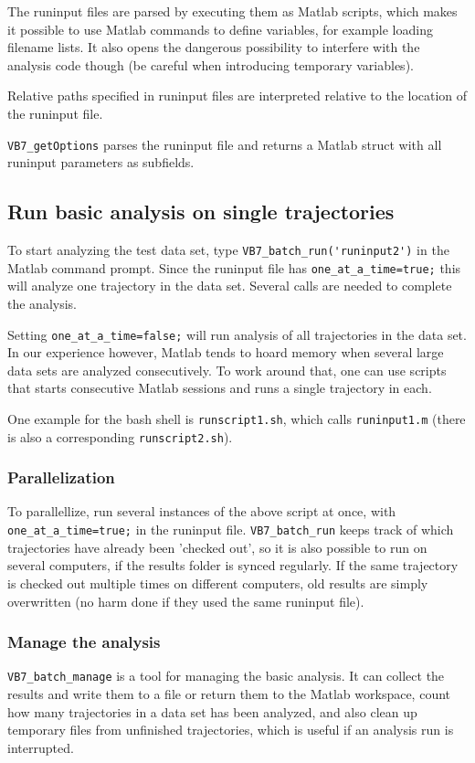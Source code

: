 The runinput files are parsed by executing them as Matlab scripts,
which makes it possible to use Matlab commands to define variables,
for example loading filename lists. It also opens the dangerous
possibility to interfere with the analysis code though (be careful when
introducing temporary variables).

Relative paths specified in runinput files are interpreted relative to
the location of the runinput file.

\texttt{VB7\_getOptions} parses the runinput file and returns a Matlab
struct with all runinput parameters as subfields.

\subsection{Run basic analysis on single trajectories}
To start analyzing the test data set, type
\verb+VB7_batch_run('runinput2')+ in the Matlab command prompt. Since
the runinput file has \verb+one_at_a_time=true;+ this will analyze one
trajectory in the data set. Several calls are needed to complete the
analysis. 

Setting \verb+one_at_a_time=false;+ will run analysis of all
trajectories in the data set. In our experience however, Matlab tends
to hoard memory when several large data sets are analyzed
consecutively.  To work around that, one can use scripts that starts
consecutive Matlab sessions and runs a single trajectory in each.

One example for the bash shell is \verb+runscript1.sh+, which calls
\verb+runinput1.m+ (there is also a corresponding
\verb+runscript2.sh+).

\subsubsection*{Parallelization}
To parallellize, run several instances of the above script at once,
with \verb+one_at_a_time=true;+ in the runinput
file. \verb+VB7_batch_run+ keeps track of which trajectories have
already been 'checked out', so it is also possible to run on several
computers, if the results folder is synced regularly. If the same
trajectory is checked out multiple times on different computers, old
results are simply overwritten (no harm done if they used the same
runinput file).

\subsubsection*{Manage the analysis}
\verb+VB7_batch_manage+ is a tool for managing the basic analysis. It
can collect the results and write them to a file or return them to the
Matlab workspace, count how many trajectories in a data set has been
analyzed, and also clean up temporary files from unfinished
trajectories, which is useful if an analysis run is interrupted.


